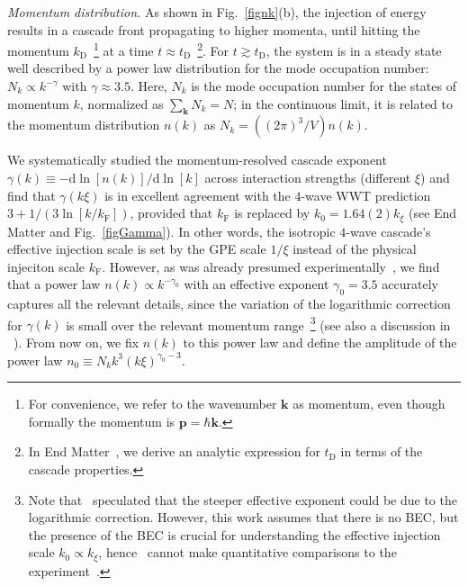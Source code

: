 \documentclass[prl,aps,twocolumn, a4paper,longbibliography,superscriptaddress]{revtex4-2}
\newcommand{\kD}{k_{\textrm{D}}}
\newcommand{\kF}{k_{\textrm{F}}}
\newcommand{\tD}{t_{\textrm{D}}}
\begin{document}
\textit{Momentum distribution.} As shown in Fig.~\ref{fignk}(b), the injection of energy results in a cascade front propagating to higher momenta, until hitting the momentum $\kD$~\footnote{{For convenience, we refer to the wavenumber $\textbf{k}$ as momentum, even though formally the momentum is $\textbf{p}=\hbar \textbf{k}$.}} at a time $t\approx\tD$~\footnote{In End Matter~\cite{Supplementary}, we derive an analytic expression for $\tD$ in terms of the cascade properties.}.
For $t\gtrsim\tD$, the system is in a steady state well described by a power law distribution for the mode occupation number: $N
_k \propto k^{-\gamma}$ with $\gamma\approx3.5$. Here, $N_k$ is the mode occupation number for the states of momentum $k$, normalized as $\sum_{\boldsymbol{k}} N_k=N$; in the continuous limit, it is related to the momentum distribution $n(k)$ as $N_k=((2\pi)^3/V)n(k)$.



We systematically studied the momentum-resolved cascade exponent $\gamma(k)\equiv-\textrm{d}\ln[n(k)]/\textrm{d}\ln{[k]}$ across interaction strengths (different $\xi$) and find that $\gamma(k\xi)$ is in excellent agreement with the $4$-wave WWT prediction $3+1/(3\ln[k/\kF])$, provided that $\kF$ is replaced by $k_0 = 1.64(2)k_\xi$ (see End Matter and Fig.~\ref{figGamma}). In other words, the isotropic $4$-wave cascade's effective injection scale is set by the GPE scale $1/\xi$ instead of the physical injeciton scale $\kF$.
However, as was already presumed experimentally~\cite{Navon:2016,Dogra:2023}, we find that a power law $n(k)\propto k^{-\gamma_0}$ with an effective exponent $\gamma_0=3.5$ accurately captures all the relevant details, since the variation of the logarithmic correction for $\gamma(k)$ is small over the relevant momentum range~\footnote{Note that~\cite{Zhu:2023a} speculated that the steeper effective exponent could be due to the logarithmic correction. However, this work assumes that there is no BEC, but the presence of the BEC is crucial for understanding the effective injection scale $k_0\propto k_\xi$, hence~\cite{Zhu:2023a} cannot make quantitative comparisons to the experiment~\cite{Navon:2016}.} (see also a discussion in ~\cite{Supplementary}). From now on, we fix $n(k)$ to this power law and define the amplitude of the power law $n_0\equiv N_kk^3 (k\xi)^{\gamma_0-3}$.
\end{document}

